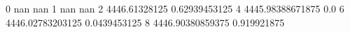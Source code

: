 0 nan nan
1 nan nan
2 4446.61328125 0.62939453125
4 4445.98388671875 0.0
6 4446.02783203125 0.0439453125
8 4446.90380859375 0.919921875
